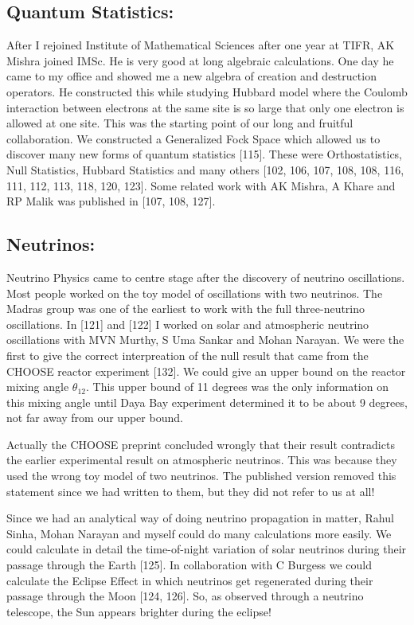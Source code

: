 \subsection*{Quantum Statistics:}
After I rejoined Institute of Mathematical Sciences after one year at 
TIFR, AK Mishra joined IMSc. He is very good at long algebraic 
calculations. One day he came to my office and showed me a new algebra 
of creation and destruction operators. He constructed this while 
studying Hubbard model where the Coulomb interaction between electrons 
at the same site is so large that only one electron is allowed at one 
site. This was the starting point of our long and fruitful 
collaboration. We constructed a Generali\-zed Fock Space which allowed us 
to discover many new forms of quantum statistics [115]. These were 
Orthostatistics, Null Stati\-stics, Hubbard Statistics and many others 
[102, 106, 107, 108, 108, 116, 111, 112, 113, 118, 120, 123]. Some related work 
with AK Mishra, A Khare and RP Malik was published in [107, 108, 127].

\vspace{-\topsep}
\subsection*{Neutrinos:}
\vskip -8pt
Neutrino Physics came to centre stage after the discovery of neutrino 
oscillations. Most people worked on the toy model of osci\-llations with 
two neutrinos. The Madras group was one of the earliest to work with the 
full three-neutrino oscillations. In [121] and [122] I worked on solar 
and atmospheric neutrino oscillations with MVN Murthy, S Uma Sankar and 
Mohan Narayan. We were the first to give the correct interpreation of 
the null result that came from the CHOOSE reactor experiment [132]. We 
could give an upper bound on the reactor mixing angle $\theta_{12}$. This 
upper bound of 11 degrees was the only information on this mixing angle 
until Daya Bay experiment determined it to be about 9 degrees, not 
far away from our upper bound.


Actually the CHOOSE preprint concluded wrongly that their result 
contradicts the earlier experimental result on atmosphe\-ric neutrinos. 
This was because they used the wrong toy model of two neutrinos. The 
published version removed this statement since we had written to them, 
but they did not refer to us at all!

Since we had an analytical way of doing neutrino propagation in matter, 
Rahul Sinha, Mohan Narayan and myself could do many calculations more 
easily. We could calculate in detail the time-of-night variation of 
solar neutrinos during their passage through the Earth [125]. In 
collaboration with C Burgess we could calculate the Eclipse Effect in 
which neutrinos get regene\-rated during their passage through the Moon 
[124, 126]. So, as observed through a neutrino telescope, the Sun 
appears brighter during the eclipse!

